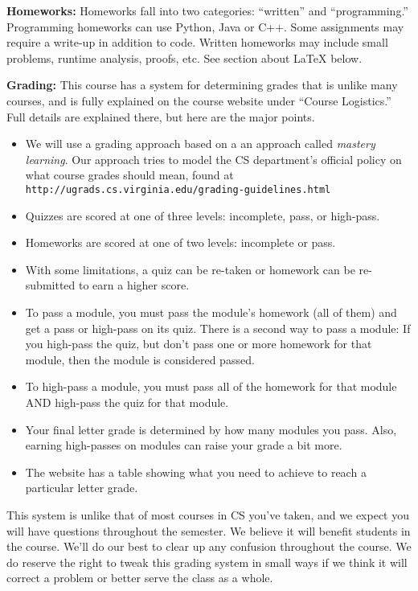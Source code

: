 \documentclass[12pt]{article}
\begin{document}
\textbf{Homeworks:} Homeworks fall into two categories:  ``written'' and ``programming.'' Programming homeworks can use Python, Java or C++. Some assignments may require a write-up in addition to code.  Written homeworks may include small problems, runtime analysis, proofs, etc.   See section about \LaTeX{} below.

\textbf{Grading:} This course has a system for determining grades that is unlike many courses, and is fully explained on the course website under ``Course Logistics.'' Full details are explained there, but here are the major points.
\begin{itemize}
    \item We will use a grading approach based on a an approach called {\it mastery learning\/}. Our approach tries to model the CS department's official policy on what course grades should mean, found at {\tt http://ugrads.cs.virginia.edu/grading-guidelines.html}
    \item Quizzes are scored at one of three levels:  incomplete, pass, or high-pass.
    \item Homeworks are scored at one of two levels:  incomplete or pass.
    \item With some limitations, a quiz can be re-taken or homework can be re-submitted to earn a higher score.
    \item To pass a module, you must pass the module's homework (all of them) and get a pass or high-pass on its quiz. There is a second way to pass a module: If you high-pass the quiz, but don't pass one or more homework for that module, then the module is considered passed.
    \item To high-pass a module, you must pass all of the homework for that module AND high-pass the quiz for that module.
    \item Your final letter grade is determined by how many modules you pass. Also, earning high-passes on modules can raise your grade a bit more.
    \item The website has a table showing what you need to achieve to reach a particular letter grade.
\end{itemize}
This system is unlike that of most courses in CS you've taken, and we expect you will have questions throughout the semester. We believe it will benefit students in the course. We'll do our best to clear up any confusion throughout the course. We do reserve the right to tweak this grading system in small ways if we think it will correct a problem or better serve the class as a whole.
\end{document}
